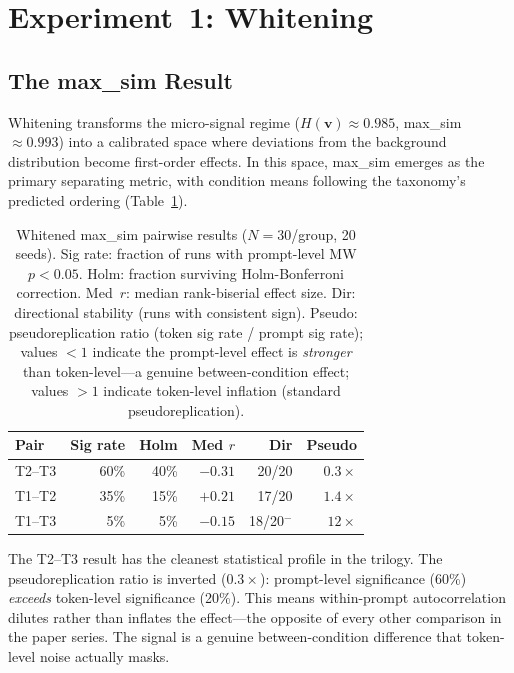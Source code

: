 \documentclass[11pt]{article}
\newcommand{\Hv}{H(\mathbf{v})}
\begin{document}

\section{Experiment~1: Whitening}

\subsection{The max\_sim Result}

Whitening transforms the micro-signal regime ($\Hv \approx 0.985$, max\_sim $\approx 0.993$) into a calibrated space where deviations from the background distribution become first-order effects. In this space, max\_sim emerges as the primary separating metric, with condition means following the taxonomy's predicted ordering (Table~\ref{tab:maxsim_results}).

\begin{table}[t]
\centering
\scriptsize
\setlength{\tabcolsep}{7pt}
\begin{tabular}{lrrrrr}
\toprule
\textbf{Pair} & \textbf{Sig rate} & \textbf{Holm} & \textbf{Med $r$} & \textbf{Dir} & \textbf{Pseudo} \\
\midrule
T2--T3 & 60\% & 40\% & $-0.31$ & 20/20 & $0.3\times$ \\
T1--T2 & 35\% & 15\% & $+0.21$ & 17/20 & $1.4\times$ \\
T1--T3 &  5\% &  5\% & $-0.15$ & 18/20$^-$ & $12\times$ \\
\bottomrule
\end{tabular}
\caption{Whitened max\_sim pairwise results ($N = 30$/group, 20 seeds). Sig rate: fraction of runs with prompt-level MW $p < 0.05$. Holm: fraction surviving Holm-Bonferroni correction. Med~$r$: median rank-biserial effect size. Dir: directional stability (runs with consistent sign). Pseudo: pseudoreplication ratio (token sig rate / prompt sig rate); values $< 1$ indicate the prompt-level effect is \textit{stronger} than token-level---a genuine between-condition effect; values $> 1$ indicate token-level inflation (standard pseudoreplication).}
\label{tab:maxsim_results}
\end{table}

The T2--T3 result has the cleanest statistical profile in the trilogy. The pseudoreplication ratio is inverted ($0.3\times$): prompt-level significance (60\%) \textit{exceeds} token-level significance (20\%). This means within-prompt autocorrelation dilutes rather than inflates the effect---the opposite of every other comparison in the paper series. The signal is a genuine between-condition difference that token-level noise actually masks.
\end{document}
